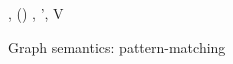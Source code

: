 \begin{figure}
    {\small \flushleft {}
    \begin{smathpar}
       {
          , () \cons \sigma
          \match
          \gamma, \kappa', V \cup \set{\alpha}
       }
    \end{smathpar}}
 \caption{Graph semantics: pattern-matching}
 \end{figure}
